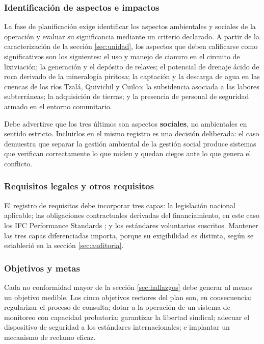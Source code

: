 \subsubsection{Identificación de aspectos e impactos}

La fase de planificación exige identificar los aspectos ambientales y sociales de
la operación y evaluar su significancia mediante un criterio declarado. A partir
de la caracterización de la sección \ref{sec:unidad}, los aspectos que deben
calificarse como significativos son los siguientes: el uso y manejo de cianuro en
el circuito de lixiviación; la generación y el depósito de relaves; el potencial
de drenaje ácido de roca derivado de la mineralogía piritosa; la captación y la
descarga de agua en las cuencas de los ríos Tzalá, Quivichil y Cuilco; la
subsidencia asociada a las labores subterráneas; la adquisición de tierras; y la
presencia de personal de seguridad armado en el entorno comunitario.

Debe advertirse que los tres últimos son aspectos \textbf{sociales}, no
ambientales en sentido estricto. Incluirlos en el mismo registro es una decisión
deliberada: el caso demuestra que separar la gestión ambiental de la gestión
social produce sistemas que verifican correctamente lo que miden y quedan ciegos
ante lo que genera el conflicto.

\subsubsection{Requisitos legales y otros requisitos}

El registro de requisitos debe incorporar tres capas: la legislación nacional
aplicable; las obligaciones contractuales derivadas del financiamiento, en este
caso los IFC Performance Standards \parencite{ifcsfmarlin}; y los estándares
voluntarios suscritos. Mantener las tres capas diferenciadas importa, porque su
exigibilidad es distinta, según se estableció en la sección \ref{sec:auditoria}.

\subsubsection{Objetivos y metas}

Cada no conformidad mayor de la sección \ref{sec:hallazgos} debe generar al menos
un objetivo medible. Los cinco objetivos rectores del plan son, en consecuencia:
regularizar el proceso de consulta; dotar a la operación de un sistema de
monitoreo con capacidad probatoria; garantizar la libertad sindical; adecuar el
dispositivo de seguridad a los estándares internacionales; e implantar un
mecanismo de reclamo eficaz.


